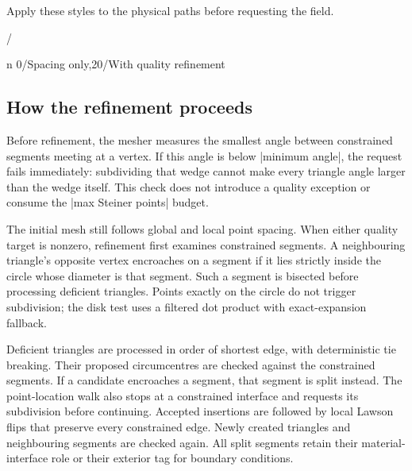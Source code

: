 Apply these styles to the physical paths before requesting the field.


\begin{codeexample}[width=0pt]
\foreach \angle/\caption in {0/Spacing only,20/With quality refinement}{

}
\end{codeexample}


\subsection{How the refinement proceeds}
Before refinement, the mesher measures the smallest angle between constrained
segments meeting at a vertex. If this angle is below |minimum angle|, the
request fails immediately: subdividing that wedge cannot make every triangle
angle larger than the wedge itself. This check does not introduce a quality
exception or consume the |max Steiner points| budget.

The initial mesh still follows global and local point spacing. When either
quality target is nonzero, refinement first examines constrained segments.
A neighbouring triangle's opposite vertex encroaches on a segment if it lies
strictly inside the circle whose diameter is that segment. Such a segment
is bisected before processing deficient triangles. Points exactly on the
circle do not trigger subdivision; the disk test uses a filtered dot product
with exact-expansion fallback.

Deficient triangles are processed in order of shortest edge, with deterministic
tie breaking. Their proposed circumcentres are checked against the constrained
segments. If a candidate encroaches a segment, that segment is split instead.
The point-location walk also stops at a constrained interface and requests
its subdivision before continuing. Accepted insertions are followed by local
Lawson flips that preserve every constrained edge. Newly created triangles
and neighbouring segments are checked again. All split segments retain their
material-interface role or their exterior tag for boundary conditions.

